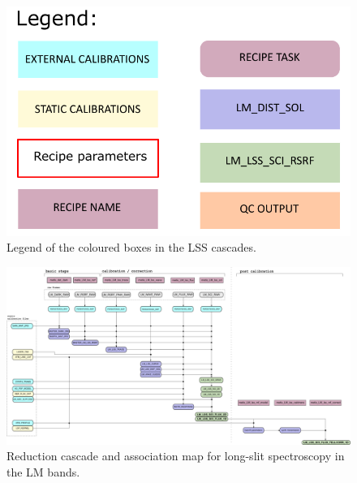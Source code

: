 \begin{figure}[ht]
  \centering
  \includegraphics[width=0.4\textheight]{figures/legend.pdf}
  \caption[Legend]{Legend of the coloured boxes in the \ac{LSS} cascades.}
  \label{Fig:LSScascadelegend}
\end{figure}
\clearpage

\begin{figure}
  \centering
  \includegraphics[width=0.9\textheight]{figures/LM_LSS_pipeline_wf_draft_latest_v0.74.png}
  \caption[Reduction cascade and association map for LM long-slit
  spectroscopy]{Reduction cascade and association map for long-slit
    spectroscopy in the LM bands.  }
  \label{Fig:LMLssAssomap}
\end{figure}





